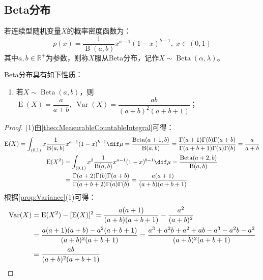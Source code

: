 \subsection{Beta分布}
\begin{definition}
	若连续型随机变量$X$的概率密度函数为：
	\begin{equation*}
		p(x)=\frac{1}{\operatorname{B}(a,b)}x^{a-1}(1-x)^{b-1},\;x\in(0,1)
	\end{equation*}
	其中$a,b\in\mathbb{R}^{+}$为参数，则称$X$服从Beta分布，记作$X\sim\operatorname{Beta}(\alpha,\lambda)$。
\end{definition}
\begin{property}
	Beta分布具有如下性质：
	\begin{enumerate}
		\item 若$X\sim\operatorname{Beta}(a,b)$，则$\operatorname{E}(X)=\dfrac{a}{a+b},\;\operatorname{Var}(X)=\dfrac{ab}{(a+b)^2(a+b+1)}$；
	\end{enumerate}
\end{property}
\begin{proof}
	(1)由\cref{theo:MeasurableCountableIntegral}可得：
	\begin{gather*}
		\operatorname{E}(X)=\int_{(0,1)}x\frac{1}{\operatorname{B}(a,b)}x^{a-1}(1-x)^{b-1}\dif\mu=\frac{\operatorname{Beta}(a+1,b)}{\operatorname{B}(a,b)}=\frac{\Gamma(a+1)\Gamma(b)\Gamma(a+b)}{\Gamma(a+b+1)\Gamma(a)\Gamma(b)}=\frac{a}{a+b} \\
		\begin{aligned}
			\operatorname{E}(X^2)&=\int_{(0,1)}x^2\frac{1}{\operatorname{B}(a,b)}x^{a-1}(1-x)^{b-1}\dif\mu=\frac{\operatorname{Beta}(a+2,b)}{\operatorname{B}(a,b)} \\
			&=\frac{\Gamma(a+2)\Gamma(b)\Gamma(a+b)}{\Gamma(a+b+2)\Gamma(a)\Gamma(b)}=\frac{a(a+1)}{(a+b)(a+b+1)}
		\end{aligned}
	\end{gather*}
	根据\cref{prop:Variance}(1)可得：
	\begin{align*}
		\operatorname{Var}(X)&=\operatorname{E}(X^2)-[\operatorname{E}(X)]^2=\frac{a(a+1)}{(a+b)(a+b+1)}-\frac{a^2}{(a+b)^2} \\
		&=\frac{a(a+1)(a+b)-a^2(a+b+1)}{(a+b)^2(a+b+1)}=\frac{a^3+a^2b+a^2+ab-a^3-a^2b-a^2}{(a+b)^2(a+b+1)} \\
		&=\frac{ab}{(a+b)^2(a+b+1)}\qedhere
	\end{align*}
\end{proof}